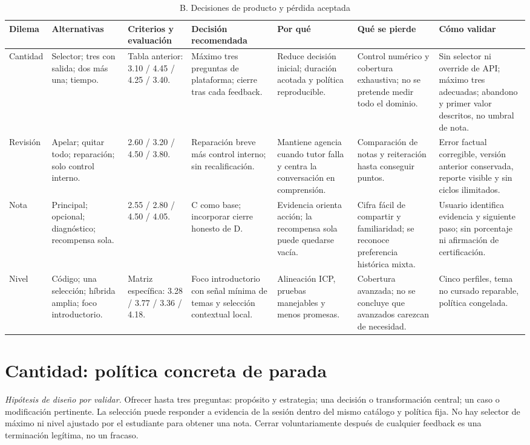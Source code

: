 \documentclass[11pt,a4paper]{report}
\newcommand{\hip}{\textit{Hipótesis de diseño por validar.}}
\begin{document}
\begin{landscape}
\small
\begin{longtable}{P{2.3cm}P{4cm}P{4.1cm}P{3.8cm}P{3.4cm}P{3cm}P{3cm}}
\caption{B. Decisiones de producto y pérdida aceptada}\label{tab:decisiones}\\
\toprule Dilema & Alternativas & Criterios y evaluación & Decisión recomendada & Por qué & Qué se pierde & Cómo validar \\\midrule\endhead
Cantidad & Selector; tres con salida; dos más una; tiempo. & Tabla anterior: 3.10 / 4.45 / 4.25 / 3.40. & Máximo tres preguntas de plataforma; cierre tras cada feedback. & Reduce decisión inicial; duración acotada y política reproducible. & Control numérico y cobertura exhaustiva; no se pretende medir todo el dominio. & Sin selector ni override de API; máximo tres adecuadas; abandono y primer valor descritos, no umbral de nota.\\
Revisión & Apelar; quitar todo; reparación; solo control interno. & 2.60 / 3.20 / 4.50 / 3.80. & Reparación breve más control interno; sin recalificación. & Mantiene agencia cuando tutor falla y centra la conversación en comprensión. & Comparación de notas y reiteración hasta conseguir puntos. & Error factual corregible, versión anterior conservada, reporte visible y sin ciclos ilimitados.\\
Nota & Principal; opcional; diagnóstico; recompensa sola. & 2.55 / 2.80 / 4.50 / 4.05. & C como base; incorporar cierre honesto de D. & Evidencia orienta acción; la recompensa sola puede quedarse vacía. & Cifra fácil de compartir y familiaridad; se reconoce preferencia histórica mixta. & Usuario identifica evidencia y siguiente paso; sin porcentaje ni afirmación de certificación.\\
Nivel & Código; una selección; híbrida amplia; foco introductorio. & Matriz específica: 3.28 / 3.77 / 3.36 / 4.18. & Foco introductorio con señal mínima de temas y selección contextual local. & Alineación ICP, pruebas manejables y menos promesas. & Cobertura avanzada; no se concluye que avanzados carezcan de necesidad. & Cinco perfiles, tema no cursado reparable, política congelada.\\\bottomrule
\end{longtable}
\end{landscape}

\section{Cantidad: política concreta de parada}
\hip{} Ofrecer hasta tres preguntas: propósito y estrategia; una decisión o transformación central; un caso o modificación pertinente. La selección puede responder a evidencia de la sesión dentro del mismo catálogo y política fija. No hay selector de máximo ni nivel ajustado por el estudiante para obtener una nota. Cerrar voluntariamente después de cualquier feedback es una terminación legítima, no un fracaso.
\end{document}
